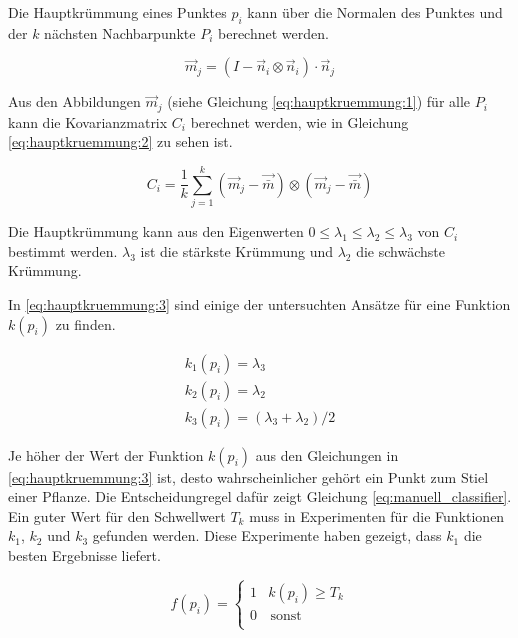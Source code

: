 \documentclass[12pt,titlepage, twoside]{article}
\begin{document}
Die Hauptkrümmung eines Punktes $p_i$ kann über die Normalen des Punktes und der $k$ nächsten Nachbarpunkte $P_i$ berechnet werden.

\begin{equation}
\label{eq:hauptkruemmung:1}
\vec{m}_j = (I - \vec{n}_i \otimes \vec{n}_i ) \cdot \vec{n}_j
\end{equation}

Aus den Abbildungen $\vec{m}_j$ (siehe Gleichung \ref{eq:hauptkruemmung:1}) für alle $P_i$ kann die Kovarianzmatrix $C_i$ berechnet werden, wie in Gleichung \ref{eq:hauptkruemmung:2} zu sehen ist.

\begin{equation}
\label{eq:hauptkruemmung:2}
C_i = \frac{1}{k} \sum_{j=1}^k{(\vec{m}_j - \vec{\bar{m}}) \otimes (\vec{m}_j - \vec{\bar{m}})}
\end{equation}

Die Hauptkrümmung kann aus den Eigenwerten $0 \leq \lambda_1 \leq \lambda_2 \leq \lambda_3$ von $C_i$ bestimmt werden. $\lambda_3$ ist die stärkste Krümmung und $\lambda_2$ die schwächste Krümmung.

In \ref{eq:hauptkruemmung:3} sind einige der untersuchten Ansätze für eine Funktion $k(p_i)$ zu finden. 

\begin{equation}
\label{eq:hauptkruemmung:3}
\begin{array}{ll}
k_1(p_i) = \lambda_3 \\
k_2(p_i) = \lambda_2 \\
k_3(p_i) = (\lambda_3 + \lambda_2) / 2 
\end{array}{}
\end{equation}

Je höher der Wert der Funktion $k(p_i)$ aus den Gleichungen in \ref{eq:hauptkruemmung:3} ist, desto wahrscheinlicher gehört ein Punkt zum Stiel einer Pflanze. 
Die Entscheidungregel dafür zeigt Gleichung \ref{eq:manuell_classifier}.
Ein guter Wert für den Schwellwert $T_k$ muss in Experimenten für die Funktionen $k_1$, $k_2$ und $k_3$ gefunden werden. 
Diese Experimente haben gezeigt, dass $k_1$ die besten Ergebnisse liefert.

\begin{equation}
\label{eq:manuell_classifier}
f(p_i) = \left\{
\begin{array}{ll}
1 & k(p_i) \geq T_k \\
0 & \, \textrm{sonst} \\
\end{array}
\right. 
\end{equation}
\end{document}
